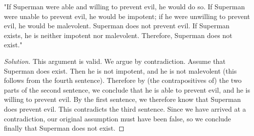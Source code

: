 \documentclass{article}
\newenvironment{solution}{\renewcommand\qedsymbol{}\begin{proof}[Solution]}{\end{proof}}
\begin{document}
\noindent
"If Superman were able and willing to prevent evil, he would do so. If Superman were unable to prevent evil, he would be impotent; if he were unwilling to prevent evil, he would be malevolent. Superman does not prevent evil. If Superman exists, he is neither impotent nor malevolent. Therefore, Superman does not exist."

\begin{solution}
This argument is valid. We argue by contradiction. Assume that Superman does exist. Then he is not impotent, and he is not malevolent (this follows from the fourth sentence). Therefore by (the contrapositives of) the two parts of the second sentence, we conclude that he is able to prevent evil, and he is willing to prevent evil. By the first sentence, we therefore know that Superman does prevent evil. This contradicts the third sentence. Since we have arrived at a contradiction, our original assumption must have been false, so we conclude finally that Superman does not exist.
\end{solution}

\clearpage
\end{document}
